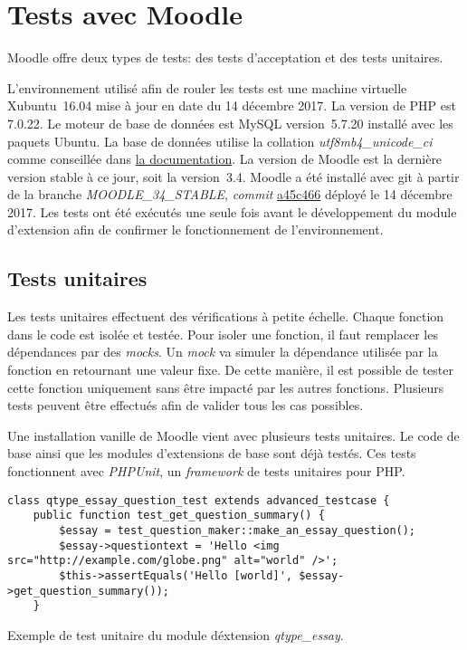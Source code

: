 \chapter{Tests avec Moodle}

Moodle offre deux types de tests: des tests d'acceptation et des tests unitaires.

L'environnement utilisé afin de rouler les tests est une machine virtuelle Xubuntu~16.04 mise à jour en date du 14 décembre 2017.
La version de PHP est 7.0.22.
Le moteur de base de données est MySQL version~5.7.20 installé avec les paquets Ubuntu.
La base de données utilise la collation \textit{utf8mb4\_unicode\_ci} comme conseillée dans \href{https://docs.moodle.org/34/en/MySQL}{la documentation}.
La version de Moodle est la dernière version stable à ce jour, soit la version~3.4.
Moodle a été installé avec git à partir de la branche \textit{MOODLE\_34\_STABLE}, \textit{commit} \href{https://github.com/moodle/moodle/commit/a45c46600021667691dbb4bce5420a2f65d3239c}{a45c466} déployé le 14 décembre 2017.
Les tests ont été exécutés une seule fois avant le développement du module d'extension afin de confirmer le fonctionnement de l'environnement.

\section{Tests unitaires}

Les tests unitaires effectuent des vérifications à petite échelle.
Chaque fonction dans le code est isolée et testée.
Pour isoler une fonction, il faut remplacer les dépendances par des \textit{mocks}.
Un \textit{mock} va simuler la dépendance utilisée par la fonction en retournant une valeur fixe.
De cette manière, il est possible de tester cette fonction uniquement sans être impacté par les autres fonctions.
Plusieurs tests peuvent être effectués afin de valider tous les cas possibles.

Une installation vanille de Moodle vient avec plusieurs tests unitaires.
Le code de base ainsi que les modules d'extensions de base sont déjà testés.
Ces tests fonctionnent avec \textit{PHPUnit}, un \textit{framework} de tests unitaires pour PHP.

\begin{lstfloat}
\begin{lstlisting}[frame=l]
class qtype_essay_question_test extends advanced_testcase {
    public function test_get_question_summary() {
        $essay = test_question_maker::make_an_essay_question();
        $essay->questiontext = 'Hello <img src="http://example.com/globe.png" alt="world" />';
        $this->assertEquals('Hello [world]', $essay->get_question_summary());
    }
\end{lstlisting}
\caption{Exemple de test unitaire du module d\'extension \textit{qtype\_essay}.}
\label{code:unittest}
\end{lstfloat}

